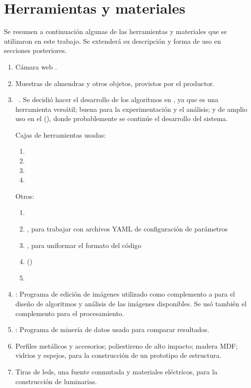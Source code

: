 \section{Herramientas y materiales}\label{intro:herramientasymateriales}
Se resumen a continuación algunas de las herramientas y materiales que se utilizaron en este trabajo. Se extenderá su descripción y forma de uso en secciones posteriores.

\begin{enumerate}
\item Cámara web .
\item Muestras  de almendras y otros objetos, provistos por el productor.
\item {}~\autocite{soft:matlab}. Se decidió hacer el desarrollo de los algoritmos en , ya que es una herramienta versátil; buena para la experimentación y el análisis; y de amplio uso en el  (), donde probablemente se continúe el desarrollo del sistema.

Cajas de herramientas usadas:
	\begin{enumerate}
	\item {}
	\item {}
	\item {}
	\item {}
	\end{enumerate}
Otros:
	\begin{enumerate}
	\item {}
	\item {}, para trabajar con archivos YAML de configuración de parámetros~\autocite{soft:yamlmatlab}
	\item {}, para uniformar el formato del código~\autocite{soft:mbeautifier}
	\item {} ({})~\autocite{soft:multic}
	\item {}~\autocite{soft:balu}
	\end{enumerate}
\item {}:  Programa de edición de imágenes utilizado como complemento a  para el diseño de algoritmos y análisis de las imágenes disponibles. Se usó también el complemento  para el procesamiento.~\autocite{soft:gimp,soft:gmic}
\item {}: Programa de minería de datos usado para comparar resultados.~\autocite{soft:knime}
\item Perfiles metálicos y accesorios; poliestireno de alto impacto; madera MDF; vidrios y espejos, para la construcción de un prototipo de estructura.
\item Tiras de leds, una fuente conmutada y materiales eléctricos, para la construcción de luminarias.
\end{enumerate}
